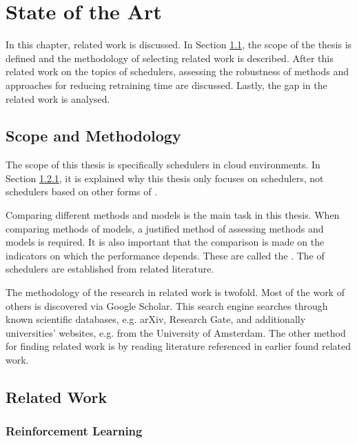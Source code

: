 \chapter{State of the Art}\label{sec:state-of-the-art}

In this chapter, related work is discussed. In Section \ref{sec:scope}, the
scope of the thesis is defined and the methodology of selecting related work is
described. After this related work on the topics of \rlbased schedulers,
assessing the robustness of \rl methods and approaches for reducing retraining
time are discussed. Lastly, the gap in the related work is analysed.


\section{Scope and Methodology}\label{sec:scope}

The scope of this thesis is specifically \rlbased schedulers in cloud
environments. In Section \ref{sec:rl}, it is explained why this thesis only
focuses on \rlbased schedulers, not schedulers based on other forms of
\ml.

Comparing different methods and models is the main task in this thesis. When
comparing methods of models, a justified method of assessing methods and models
is required. It is also important that the comparison is made on the
indicators on which the performance depends. These are called the \kpis. The
\kpis of \rlbased schedulers are established from related literature.

The methodology of the research in related work is twofold. Most of the work
of others is discovered via Google Scholar. This
search engine searches through known scientific databases, e.g.
arXiv, Research Gate, and
additionally universities' websites, e.g. from the University of
Amsterdam. The other method for finding related work is by
reading literature referenced in earlier found related work.


\section{Related Work}

\subsection{Reinforcement Learning}\label{sec:rl}

